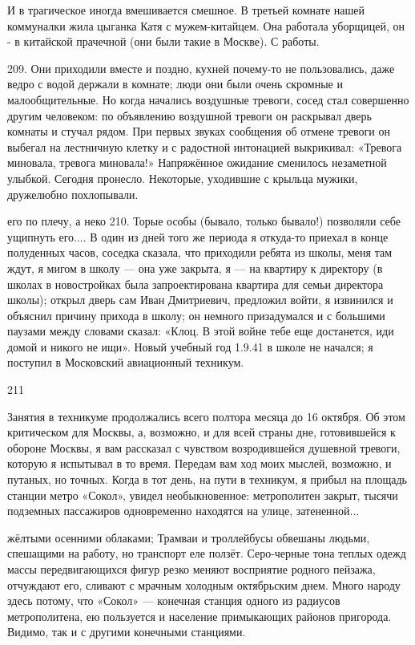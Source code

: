 И в трагическое иногда вмешивается смешное. В третьей комнате нашей коммуналки жила цыганка Катя с мужем-китайцем. Она работала уборщицей, он - в китайской прачечной (они были такие в Москве). С работы.

209.
Они приходили вместе и поздно, кухней почему-то не пользовались, даже ведро с водой держали в комнате; люди они были очень скромные и малообщительные. Но когда начались воздушные тревоги, сосед стал совершенно другим человеком: по объявлению воздушной тревоги он раскрывал дверь комнаты и стучал рядом. При первых звуках сообщения об отмене тревоги он выбегал на лестничную клетку и с радостной интонацией выкрикивал: «Тревога миновала, тревога миновала!» Напряжённое ожидание сменилось незаметной улыбкой. Сегодня пронесло. Некоторые, уходившие с крыльца мужики, дружелюбно похлопывали.

его по плечу, а неко 210. Торые особы (бывало, только бывало!) позволяли себе ущипнуть его.... В один из дней того же периода я откуда-то приехал в конце полуденных часов, соседка сказала, что приходили ребята из школы, меня там ждут, я мигом в школу — она уже закрыта, я — на квартиру к директору (в школах в новостройках была запроектирована квартира для семьи директора школы); открыл дверь сам Иван Дмитриевич, предложил войти, я извинился и объяснил причину прихода в школу; он немного призадумался и с большими паузами между словами сказал: «Клоц. В этой войне тебе еще достанется, иди домой и никого не ищи». Новый учебный год 1.9.41 в школе не начался; я поступил в Московский авиационный техникум.

211

Занятия в техникуме продолжались всего полтора месяца до 16 октября. Об этом критическом для Москвы, а, возможно, и для всей страны дне, готовившейся к обороне Москвы, я вам рассказал с чувством возродившейся душевной тревоги, которую я испытывал в то время. Передам вам ход моих мыслей, возможно, и путаных, но точных. Когда в тот день, на пути в техникум, я прибыл на площадь станции метро «Сокол», увидел необыкновенное: метрополитен закрыт, тысячи подземных пассажиров одновременно находятся на улице, затененной...

жёлтыми осенними облаками; Трамваи и троллейбусы обвешаны людьми, спешащими на работу, но транспорт еле ползёт. Серо-черные тона теплых одежд массы передвигающихся фигур резко меняют восприятие родного пейзажа, отчуждают его, сливают с мрачным холодным октябрьским днем. Много народу здесь потому, что «Сокол» — конечная станция одного из радиусов метрополитена, ею пользуется и население примыкающих районов пригорода. Видимо, так и с другими конечными станциями.

